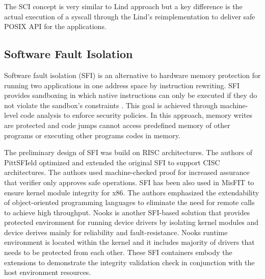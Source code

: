 
The SCI concept is very similar to Lind approach but a key difference is the actual execution of a syscall through the Lind's reimplementation to deliver safe POSIX API for the applications.

\subsection{Software Fault Isolation}
Software fault isolation (SFI) is an alternative to hardware memory
protection for running two applications in one address space by
instruction rewriting. SFI provides sandboxing in which native
instructions can only be executed if they do not violate the sandbox's
constraints \cite{SFI:93}. This goal is achieved through machine-level
code analysis to enforce security policies. In this approach, memory
writes are protected and code jumps cannot access predefined memory of
other programs or executing other programs codes in memory.

The preliminary design of SFI was build on RISC
architectures. The authors of PittSFIeld \cite{PittSFIeld} optimized and
extended the original SFI to support CISC architectures. 
The authors used machine-checked proof for increased assurance that
verifier only approves safe operations.
%
SFI has been also used in MisFIT \cite{MISFit} to ensure kernel
module integrity for x86. The authors emphasized the
extendability of object-oriented programming languages to eliminate
the need for remote calls to achieve high throughput. 
%
Nooks \cite{Nooks:03} is another SFI-based solution that provides
protected environment for running device drivers by isolating kernel
modules and device derives mainly for reliability and
fault-resistance. Nooks runtime environment is located within the
kernel and it includes majority of drivers that needs to be protected
from each other. 
These SFI containers embody the extensions to demonstrate the integrity
validation check in conjunction with the host environment resources.

